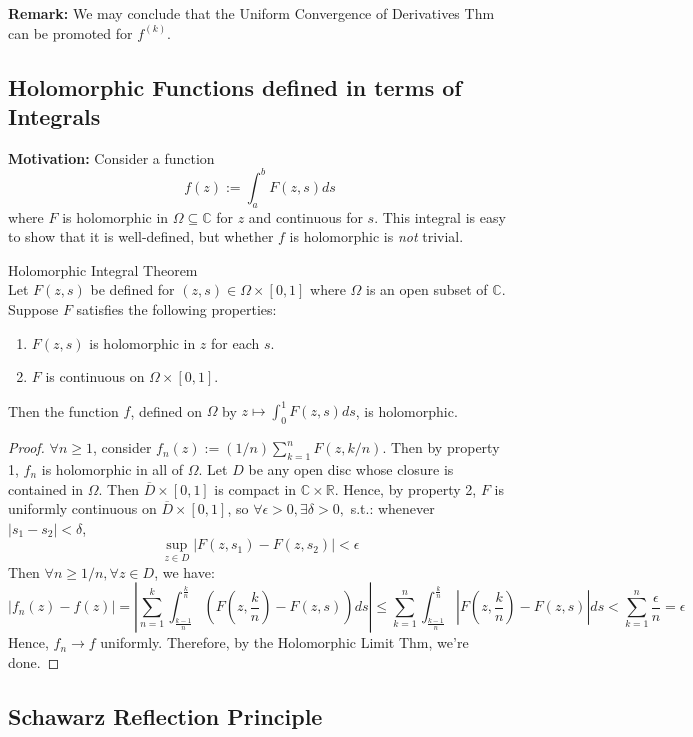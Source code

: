 \noindent\textbf{Remark:} We may conclude that the Uniform Convergence of Derivatives Thm can be promoted for $f^{(k)}$.


\subsection{Holomorphic Functions defined in terms of Integrals}

\noindent\textbf{Motivation:} Consider a function
\[
f(z):= \int_a^b F(z,s) ds
\]
where $F$ is holomorphic in $\Omega \subseteq \mathbb{C}$ for $z$ and continuous for $s$. This integral is easy to show that it is well-defined, but whether $f$ is holomorphic is \textit{not} trivial.

\begin{theorem}{Holomorphic Integral Theorem}\\
Let $F(z,s)$ be defined for $(z,s) \in \Omega \times [0,1]$ where $\Omega$ is an open subset of $\mathbb{C}$. Suppose $F$ satisfies the following properties:
\begin{enumerate}
    \item $F(z,s)$ is holomorphic in $z$ for each $s$.
    \item $F$ is continuous on $\Omega \times [0,1]$.
\end{enumerate}
Then the function $f$, defined on $\Omega$ by $z \mapsto \int_0^1 F(z,s)ds$, is holomorphic.
\end{theorem}

\begin{proof}
    $\forall n\geq 1$, consider $f_n(z):= (1/n) \sum_{k=1}^n F(z,k/n)$. Then by property 1, $f_n$ is holomorphic in all of $\Omega$. Let $D$ be any open disc whose closure is contained in $\Omega$. Then $\overline{D} \times [0,1]$ is compact in $\mathbb{C} \times \mathbb{R}$. Hence, by property 2, $F$ is uniformly continuous on $\overline{D} \times [0,1]$, so $\forall \epsilon>0, \exists \delta>0,$ s.t.: whenever $|s_1-s_2|<\delta$,
    \[
    \sup_{z\in D} |F(z,s_1)- F(z,s_2)|<\epsilon
    \]
    Then $\forall n \geq 1/n, \forall z\in D$, we have:
    \[
    |f_n(z)-f(z)|= |\sum_{n=1}^k \int_{\frac{k-1}{n}}^{\frac{k}{n}} (F(z,\frac{k}{n}) -F(z,s)) ds| \leq \sum_{k=1}^n \int_{\frac{k-1}{n}}^{\frac{k}{n}} |F(z,\frac{k}{n}) -F(z,s)| ds< \sum_{k=1}^n \frac{\epsilon}{n}= \epsilon
    \]
    Hence, $f_n\to f$ uniformly. Therefore, by the Holomorphic Limit Thm, we're done.
\end{proof}

\subsection{Schawarz Reflection Principle}

